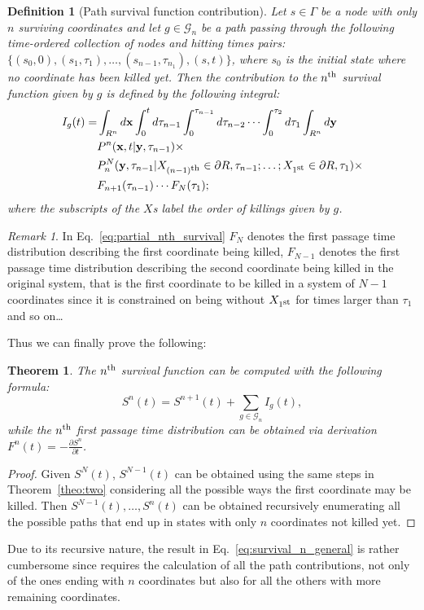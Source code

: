 \documentclass[a4paper,11pt]{amsart}
\newtheorem{theorem}{Theorem}
\newtheorem{definition}{Definition}
\theoremstyle{remark}
\newtheorem{remark}{Remark}
\newcommand{\nth}{n\textsuperscript{th}}
\newcommand{\partialO}[2]{\frac{\partial #1}{\partial #2}}
\begin{document}
 \begin{definition}[Path survival function contribution]
   Let $s\in\Gamma$ be a node with only $n$ surviving coordinates and let $g \in \mathcal{G}_n$ be a path passing through the following time-ordered collection of nodes and hitting times pairs: \\ $\{(s_0,0),(s_1,\tau_1),\ldots,(s_{n-1},\tau_{n_1}),(s,t)\}$, where $s_0$ is the initial state where no coordinate has been killed yet. Then the contribution to the $\nth$ survival function given by $g$ is defined by the following integral:
   \begin{equation}
     \label{eq:partial_nth_survival}
     \begin{aligned}
       I_g(t)=&\int_{R^n}d\mathbf{x}\int_0^t d\tau_{n-1}\int_0^{\tau_{n-1}}d\tau_{n-2}\cdots\int_0^{\tau_2}d\tau_1 \int_{R^n}d\mathbf{y}\\
              &P^n(\mathbf{x},t|\mathbf{y},\tau_{n-1}) \times\\
       &P^{N}_n(\mathbf{y},\tau_{n-1}|X_{(n-1)\textsuperscript{th}}\in\partial R,\tau_{n-1};\ldots;X_{1\textsuperscript{st}}\in\partial R,\tau_1)\times\\
       &F_{n+1}(\tau_{n-1})\cdots F_{N}(\tau_1);
     \end{aligned}     
   \end{equation}
   where the subscripts of the $X$s label the order of killings given by $g$.
 \end{definition}
 \begin{remark}
   In Eq.~\eqref{eq:partial_nth_survival} $F_{N}$ denotes the first passage time distribution describing the first coordinate being killed, $F_{N-1}$ denotes the first passage time distribution describing the second coordinate being killed in the original system, that is the first coordinate to be killed in a system of $N-1$ coordinates since it is constrained on being without $X_{1\textsuperscript{st}}$ for times larger than $\tau_1$ and so on\ldots
 \end{remark}
 Thus we can finally prove the following:
 \begin{theorem}
 \label{theo:many}
   The $\nth$ survival function can be computed with the following formula:
   \begin{equation}
     \label{eq:survival_n_general}
     S^n(t)=S^{n+1}(t) + \sum_{g\in\mathcal{G}_n}I_g(t),
   \end{equation}
   while the $\nth$ first passage time distribution can be obtained via derivation $F^n(t)=-\partialO{S^n}{t}$.
 \end{theorem}
 \begin{proof}
   Given $S^N(t)$, $S^{N-1}(t)$ can be obtained using the same steps in Theorem~\ref{theo:two} considering all the possible ways the first coordinate may be killed. Then $S^{N-1}(t),\ldots,S^n(t)$ can be obtained recursively enumerating all the possible paths that end up in states with only $n$ coordinates not killed yet.
 \end{proof}
 Due to its recursive nature, the result in Eq.~\eqref{eq:survival_n_general} is rather cumbersome since requires the calculation of all the path contributions, not only of the ones ending with $n$ coordinates but also for all the others with more remaining coordinates.
\end{document}

